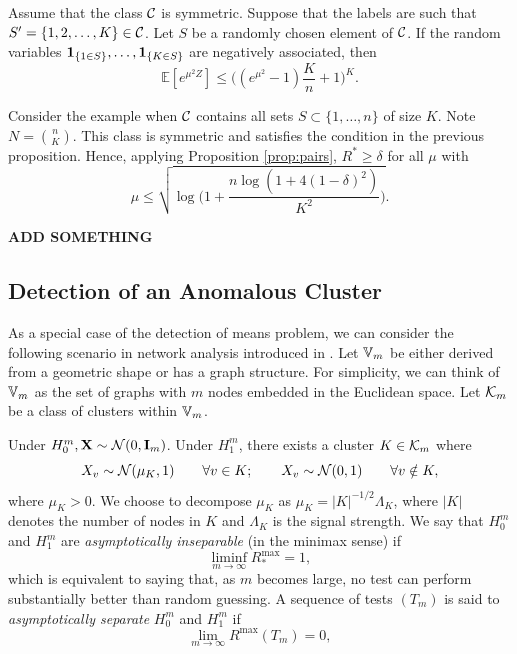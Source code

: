\documentclass[10pt, oneside]{article}
\begin{document}
\begin{prop}
  \label{negass}
  Assume that the class ${\mathcal C}$ is symmetric. Suppose that the labels are such that $S'=\{1,2,\ldots,K\} \in{\mathcal C}$. Let $S$ be a randomly chosen element of ${\mathcal C}$. If the random variables
  ${\bf 1}_{\{ 1 \in S \}},\ldots,{\bf 1}_{\{ K\in S \}}$ are negatively associated, then 
  $$\mathbb{E}[ e^{\mu^2 Z}]\le \biggl( (e^{\mu^2} -1 ) \frac{K}{n} +1 \biggr)^K.$$
\end{prop}
\begin{exmp}
  Consider the example when ${\mathcal C}$ contains all sets $S \subset\{1,\ldots ,n\}$ of size $K$. Note $N={n\choose K}$. This class is symmetric and satisfies the condition in the previous proposition. Hence, applying Proposition \ref{prop:pairs}, $R^*\ge\delta$ for all $\mu$ with
  \[
  \mu\le\sqrt{\log\biggl(1+\frac{n\log(1+4(1-\delta)^2)}{K^2} \biggr)}.
  \]
\end{exmp}
{\bf ADD SOMETHING}


\subsection{Detection of an Anomalous Cluster}
As a special case of the detection of means problem, we can consider the following scenario in network analysis introduced in \cite{arias2011detection}.
Let $\mathbb V_m$ be either derived from a geometric shape or has a graph structure. For simplicity, we can think of $\mathbb V_m$ as the set of graphs with $m$ nodes embedded in the Euclidean space. Let ${\mathcal K}_m$ be a class of clusters within $\mathbb V_m$.

Under $H_0^m, \mathbf{X} \sim {\mathcal N}(0, \mathbf{I}_m)$. Under $H_1^m$, there exists a cluster $K \in {\mathcal K}_m$ where 
%
\[
X_v \sim{\mathcal N}(\mu_K,1)\qquad \forall v \in K;\qquad X_v \sim
{\mathcal N}(0,1)\qquad \forall v \notin K,
\]
%
where $\mu_K > 0$.
We choose to decompose $\mu_K$ as $\mu_K = |K|^{-1/2} \Lambda_K$, where
$|K|$ denotes the number of nodes in $K$ and $\Lambda_K$ is the signal
strength. We say that $H_0^m$ and $H_1^m$ are {\it asymptotically inseparable}
(in the minimax sense) if
%
\[
\liminf_{m \to\infty} R_{*}^{\max} = 1,
\]
%
which is equivalent to saying that, as $m$ becomes large, no test can
perform substantially better than random guessing. A sequence of tests $(T_m)$ is said to {\it asymptotically separate} $H
_0^m$ and $H_1^m$ if
%
\[
\lim_{m \to\infty} R^{\max}(T_m) = 0,
\]
\end{document}
